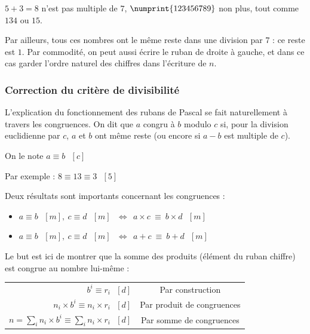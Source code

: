 \documentclass[a4paper]{article}
\begin{document}
$5 + 3 = 8$ n'est pas multiple de $7$, $\numprint{123456789}$ non plus, tout comme $134$ ou $15$.

\vspace{2mm}

Par ailleurs, tous ces nombres ont le même reste dans une division par $7$ : ce reste est $1$. 
Par commodité, on peut aussi écrire le ruban de droite à gauche, et dans ce cas garder l'ordre naturel des chiffres dans l'écriture de $n$.\\

\vfill



\subsubsection*{Correction du critère de divisibilité}\label{ruban_correction}

	L'explication du fonctionnement des rubans de Pascal se fait naturellement à travers les congruences. On dit que $a$ congru à $b$ modulo $c$ si, pour la division euclidienne par $c$, $a$ et $b$ ont même reste (ou encore si $a - b$ est multiple de $c$).
	
\vspace{2 mm}
	
	On le note $a ≡ b ~~~ [c]$
	
\vspace{2 mm}
	
	Par exemple : $8 ≡ 13 ≡ 3 ~~~ [5]$
	
\vspace{2 mm}
	 
	Deux résultats sont importants concernant les congruences :

\begin{itemize}
	\item[] $a ≡ b ~~~ [m], ~ c ≡ d ~~~ [m] ~~~ \Longleftrightarrow ~~ a \times c ~ ≡ ~ b \times d ~~~ [m]$
    \item[] $a ≡ b ~~~ [m], ~ c ≡ d ~~~ [m] ~~~ \Longleftrightarrow ~~ a + c ~ ≡ ~ b + d ~~~ [m]$
\end{itemize}	

\vspace{2 mm}

	Le but est ici de montrer que la somme des produits (élément du ruban \times chiffre) est congrue au nombre lui-même : 
	
\begin{tabular}{rc}

$b^i ≡ r_i ~~~ [d]$ & Par construction\\
$n_i \times b^i ≡ n_i \times r_i ~~~ [d]$ & Par produit de congruences\\
$n = \sum\limits_i n_i \times b^i ≡ \sum\limits_i n_i \times r_i ~~~ [d]$ & Par somme de congruences\\

\end{tabular}
\end{document}
